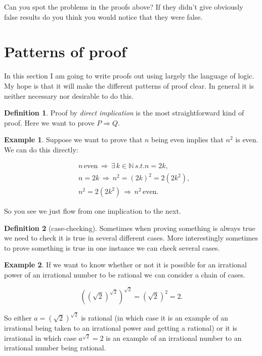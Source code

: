 \documentclass[
]{book}
\theoremstyle{definition}
\newtheorem{definition}{Definition}[chapter]
\theoremstyle{definition}
\newtheorem{example}{Example}[chapter]
\theoremstyle{definition}
\theoremstyle{definition}
\theoremstyle{remark}
\begin{document}
Can you spot the problems in the proofs above? If they didn't give obviously false results do you think you would notice that they were false.

\section{Patterns of proof}\label{patterns-of-proof}

In this section I am going to write proofs out using largely the language of logic. My hope is that it will make the different patterns of proof clear. In general it is neither necessary nor desirable to do this.

\begin{definition}
Proof by \emph{direct implication} is the most straightforward kind of proof. Here we want to prove \(P \Rightarrow Q\).
\end{definition}

\begin{example}
Suppose we want to prove that \(n\) being even implies that \(n^2\) is even. We can do this directly:

\begin{align*}
 & n \, \mbox{even} \, \Rightarrow \, \exists \, k \in \mathbb{N} \, s.t. n=2k, \\
 & n = 2k \, \Rightarrow \, n^2 = (2k)^2 = 2 (2k^2), \\
 & n^2 = 2(2k^2) \, \Rightarrow \, n^2 \, \mbox{even}.
\end{align*}

So you see we just flow from one implication to the next.
\end{example}

\begin{definition}[case-checking]
Sometimes when proving something is always true we need to check it is true in several different cases. More interestingly sometimes to prove something is true in one instance we can check several cases.
\end{definition}

\begin{example}
If we want to know whether or not it is possible for an irrational power of an irrational number to be rational we can consider a chain of cases.

\[ ((\sqrt{2})^{\sqrt{2}})^{\sqrt{2}} = (\sqrt{2})^2 = 2.  \]

So either \(a=(\sqrt{2})^{\sqrt{2}}\) is rational (in which case it is an example of an irrational being taken to an irrational power and getting a rational) or it is irrational in which case \(a^{\sqrt{2}} =2\) is an example of an irrational number to an irrational number being rational.
\end{example}
\end{document}
